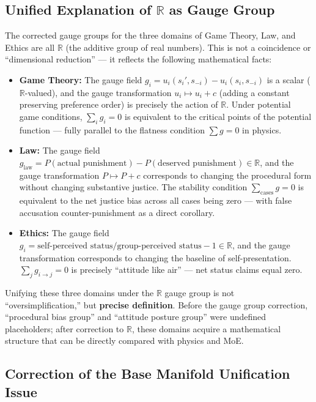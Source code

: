 \documentclass[12pt,a4paper]{article}
\theoremstyle{plain}
\theoremstyle{definition}
\newcommand{\R}{\mathbb{R}}
\begin{document}
\subsection{Unified Explanation of $\R$ as Gauge Group}

The corrected gauge groups for the three domains of Game Theory, Law, and Ethics are all $\R$ (the additive group of real numbers). This is not a coincidence or ``dimensional reduction'' — it reflects the following mathematical facts:

\begin{itemize}
    \item \textbf{Game Theory:} The gauge field $g_i = u_i(s_i', s_{-i}) - u_i(s_i, s_{-i})$ is a scalar ($\R$-valued), and the gauge transformation $u_i \mapsto u_i + c$ (adding a constant preserving preference order) is precisely the action of $\R$. Under potential game conditions, $\sum_i g_i = 0$ is equivalent to the critical points of the potential function — fully parallel to the flatness condition $\sum g = 0$ in physics.
    
    \item \textbf{Law:} The gauge field $g_{\text{law}} = P(\text{actual punishment}) - P(\text{deserved punishment}) \in \R$, and the gauge transformation $P \mapsto P + c$ corresponds to changing the procedural form without changing substantive justice. The stability condition $\sum_{\text{cases}} g = 0$ is equivalent to the net justice bias across all cases being zero — with false accusation counter-punishment as a direct corollary.
    
    \item \textbf{Ethics:} The gauge field $g_i = \text{self-perceived status} / \text{group-perceived status} - 1 \in \R$, and the gauge transformation corresponds to changing the baseline of self-presentation. $\sum_j g_{i \to j} = 0$ is precisely ``attitude like air'' — net status claims equal zero.
\end{itemize}

Unifying these three domains under the $\R$ gauge group is not ``oversimplification,'' but \textbf{precise definition}. Before the gauge group correction, ``procedural bias group'' and ``attitude posture group'' were undefined placeholders; after correction to $\R$, these domains acquire a mathematical structure that can be directly compared with physics and MoE.

\subsection{Correction of the Base Manifold Unification Issue}
\end{document}
